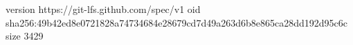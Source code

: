 version https://git-lfs.github.com/spec/v1
oid sha256:49b42ed8e0721828a74734684e28679cd7d49a263d6b8e865ca28dd192d95c6c
size 3429
